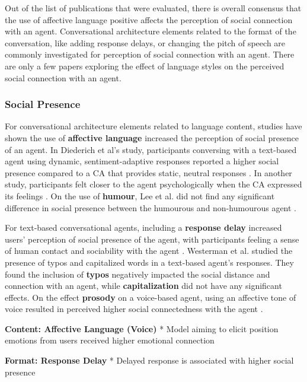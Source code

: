 Out of the list of publications that were evaluated, there is overall consensus that the use of affective language positive affects the perception of social connection with an agent. Conversational architecture elements related to the format of the conversation, like adding response delays, or changing the pitch of speech are commonly investigated for perception of social connection with an agent. There are only a few papers exploring the effect of language styles on the perceived social connection with an agent. 

\subsubsection{Social Presence}
For conversational architecture elements related to language content, studies have shown the use of \textbf{affective language} increased the perception of social presence of an agent. In Diederich et al's study, participants conversing with a text-based agent using dynamic, sentiment-adaptive responses reported a higher social presence compared to a CA that provides static, neutral responses \cite{diederich2019emulating}\cmt{[25]}. In another study, participants felt closer to the agent psychologically when the CA expressed its feelings \cite{lee2019s}\cmt{[55]}. On the use of \textbf{humour}, Lee et al. did not find any significant difference in social presence between the humourous and non-humourous agent \cite{lee2019s}\cmt{[55]}.

For text-based conversational agents, including a \textbf{response delay} increased users' perception of social presence of the agent, with participants feeling a sense of human contact and sociability with the agent \cite{kim2020can}\cmt{[24]}. Westerman et al. \cite{westerman2019believe}\cmt{[9]} studied the presence of typos and capitalized words in a text-based agent's responses. They found the inclusion of \textbf{typos} negatively impacted the social distance and connection with an agent, while \textbf{capitalization} did not have any significant effects. On the effect \textbf{prosody} on a voice-based agent, using an affective tone of voice resulted in perceived higher social connectedness with the agent \cite{kim2020can}\cmt{[24]}.

\textbf{Content: Affective Language (Voice)}
* Model aiming to elicit position emotions from users received higher emotional connection \cite{lubis2019positive}\cmt{[43]}

\textbf{Format: Response Delay}
* Delayed response is associated with higher social presence \cite{gnewuch2022opposing}\cmt{[20]}

